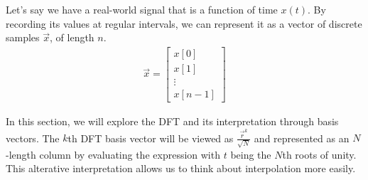 

Let's say we have a real-world signal that is a function of time
$x(t)$. By recording its values at regular intervals, we can represent
it as a vector of discrete samples $\vec{x}$, of length $n$.   
\begin{align}
\vec{x}  = \begin{bmatrix} x[0] \\ x[1] \\ \vdots \\ x[n-1] \end{bmatrix}
\end{align}

In this section, we will explore the DFT and its interpretation through basis vectors.
The $k$th DFT basis vector will be viewed as
$\frac{\vec{r}^k}{\sqrt{N}}$ and represented as an $N$-length column by
evaluating the expression with $t$ being the $N$th roots of unity.
This alterative interpretation allows us to think about interpolation
more easily.


